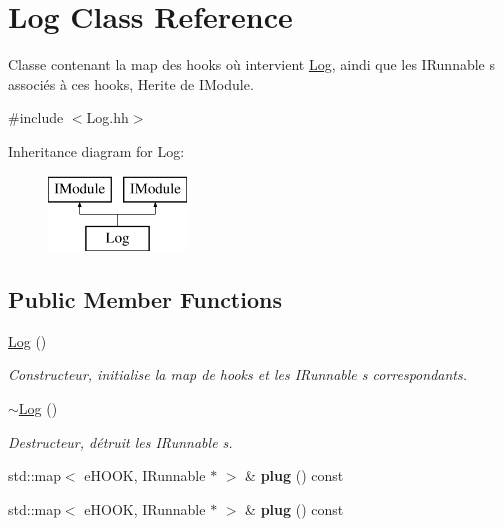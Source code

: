 \hypertarget{class_log}{}\section{Log Class Reference}
\label{class_log}


Classe contenant la map des hooks où intervient \hyperlink{class_log}{Log}, aindi que les I\+Runnable s associés à ces hooks, Herite de I\+Module.  




{\ttfamily \#include $<$Log.\+hh$>$}

Inheritance diagram for Log\+:\begin{figure}[H]
\begin{center}
\leavevmode
\includegraphics[height=2.000000cm]{class_log}
\end{center}
\end{figure}
\subsection*{Public Member Functions}
\begin{DoxyCompactItemize}
\item 
\hypertarget{class_log_af6071a60aa52b6c1b511f99b4bc1b8fe}{}\hyperlink{class_log_af6071a60aa52b6c1b511f99b4bc1b8fe}{Log} ()\label{class_log_af6071a60aa52b6c1b511f99b4bc1b8fe}

\begin{DoxyCompactList}\small\item\em Constructeur, initialise la map de hooks et les I\+Runnable s correspondants. \end{DoxyCompactList}\item 
\hypertarget{class_log_a0fbfda88fbee5027c89f6eb121059360}{}\hyperlink{class_log_a0fbfda88fbee5027c89f6eb121059360}{$\sim$\+Log} ()\label{class_log_a0fbfda88fbee5027c89f6eb121059360}

\begin{DoxyCompactList}\small\item\em Destructeur, détruit les I\+Runnable s. \end{DoxyCompactList}\item 
\hypertarget{class_log_ae94ec4c552b8f30a45acc752fd690163}{}std\+::map$<$ e\+H\+O\+O\+K, I\+Runnable $\ast$ $>$ \& {\bfseries plug} () const \label{class_log_ae94ec4c552b8f30a45acc752fd690163}

\item 
\hypertarget{class_log_ae94ec4c552b8f30a45acc752fd690163}{}std\+::map$<$ e\+H\+O\+O\+K, I\+Runnable $\ast$ $>$ \& {\bfseries plug} () const \label{class_log_ae94ec4c552b8f30a45acc752fd690163}

\end{DoxyCompactItemize}


